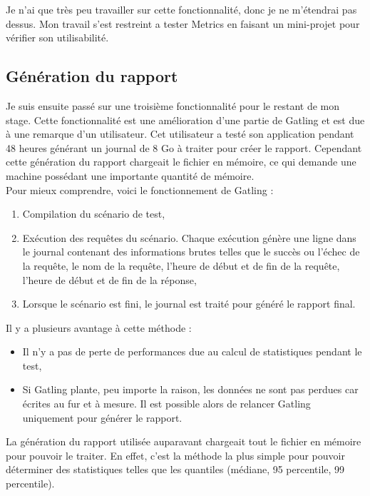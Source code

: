 Je n'ai que très peu travailler sur cette fonctionnalité, donc je ne m'étendrai pas dessus. Mon travail s'est restreint a tester Metrics en faisant un mini-projet pour vérifier son utilisabilité.

\subsection{Génération du rapport}

Je suis ensuite passé sur une troisième fonctionnalité pour le restant de mon stage. Cette fonctionnalité est une amélioration d'une partie de Gatling et est due à une remarque d'un utilisateur. Cet utilisateur a testé son application pendant 48 heures générant un journal de 8 Go à traiter pour créer le rapport. Cependant cette génération du rapport chargeait le fichier en mémoire, ce qui demande une machine possédant une importante quantité de mémoire.\\

Pour mieux comprendre, voici le fonctionnement de Gatling :
\begin{enumerate}
 \item Compilation du scénario de test,
 \item Exécution des requêtes du scénario. Chaque exécution génère une ligne dans le journal contenant des informations brutes telles que le succès ou l'échec de la requête, le nom de la requête, l'heure de début et de fin de la requête, l'heure de début et de fin de la réponse,
 \item Lorsque le scénario est fini, le journal est traité pour généré le rapport final.\\
\end{enumerate}

Il y a plusieurs avantage à cette méthode :
\begin{itemize}
 \item Il n'y a pas de perte de performances due au calcul de statistiques pendant le test,
 \item Si Gatling plante, peu importe la raison, les données ne sont pas perdues car écrites au fur et à mesure. Il est possible alors de relancer Gatling uniquement pour générer le rapport.\\
\end{itemize}

La génération du rapport utilisée auparavant chargeait tout le fichier en mémoire pour pouvoir le traiter. En effet, c'est la méthode la plus simple pour pouvoir déterminer des statistiques telles que les quantiles (médiane, 95\ieme{} percentile, 99\ieme{} percentile).\\

